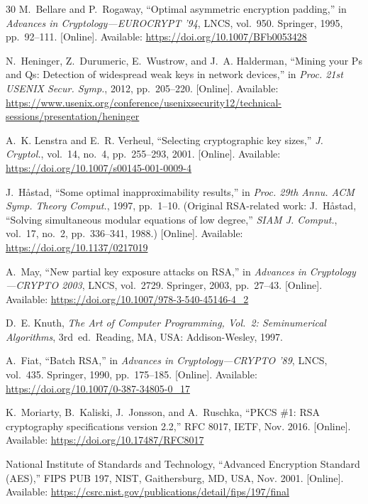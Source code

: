 \documentclass[journal]{IEEEtran}
\begin{document}
\begin{thebibliography}{30}
M.~Bellare and P.~Rogaway, ``Optimal asymmetric encryption padding,'' in \textit{Advances in Cryptology---EUROCRYPT '94}, LNCS, vol.~950. Springer, 1995, pp.~92--111. [Online]. Available: \url{https://doi.org/10.1007/BFb0053428}

N.~Heninger, Z.~Durumeric, E.~Wustrow, and J.~A. Halderman, ``Mining your Ps and Qs: Detection of widespread weak keys in network devices,'' in \textit{Proc. 21st USENIX Secur. Symp.}, 2012, pp.~205--220. [Online]. Available: \url{https://www.usenix.org/conference/usenixsecurity12/technical-sessions/presentation/heninger}

A.~K. Lenstra and E.~R. Verheul, ``Selecting cryptographic key sizes,'' \textit{J. Cryptol.}, vol.~14, no.~4, pp.~255--293, 2001. [Online]. Available: \url{https://doi.org/10.1007/s00145-001-0009-4}

J.~H{\aa}stad, ``Some optimal inapproximability results,'' in \textit{Proc. 29th Annu. ACM Symp. Theory Comput.}, 1997, pp.~1--10. (Original RSA-related work: J.~H{\aa}stad, ``Solving simultaneous modular equations of low degree,'' \textit{SIAM J. Comput.}, vol.~17, no.~2, pp.~336--341, 1988.) [Online]. Available: \url{https://doi.org/10.1137/0217019}

A.~May, ``New partial key exposure attacks on RSA,'' in \textit{Advances in Cryptology---CRYPTO 2003}, LNCS, vol.~2729. Springer, 2003, pp.~27--43. [Online]. Available: \url{https://doi.org/10.1007/978-3-540-45146-4_2}

D.~E. Knuth, \textit{The Art of Computer Programming, Vol.~2: Seminumerical Algorithms}, 3rd~ed.\ Reading, MA, USA: Addison-Wesley, 1997.

A.~Fiat, ``Batch RSA,'' in \textit{Advances in Cryptology---CRYPTO '89}, LNCS, vol.~435. Springer, 1990, pp.~175--185. [Online]. Available: \url{https://doi.org/10.1007/0-387-34805-0_17}

K.~Moriarty, B.~Kaliski, J.~Jonsson, and A.~Ruschka, ``PKCS \#1: RSA cryptography specifications version 2.2,'' RFC 8017, IETF, Nov. 2016. [Online]. Available: \url{https://doi.org/10.17487/RFC8017}

National Institute of Standards and Technology, ``Advanced Encryption Standard (AES),'' FIPS PUB 197, NIST, Gaithersburg, MD, USA, Nov. 2001. [Online]. Available: \url{https://csrc.nist.gov/publications/detail/fips/197/final}


\end{thebibliography}
\end{document}

